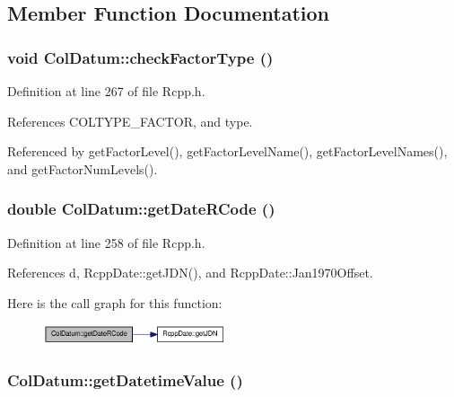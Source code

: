 \subsection{Member Function Documentation}
\hypertarget{classColDatum_a9d151a64fb91608752346a9a16551410}{
\subsubsection[{checkFactorType}]{\setlength{\rightskip}{0pt plus 5cm}void ColDatum::checkFactorType ()}}
\label{classColDatum_a9d151a64fb91608752346a9a16551410}


Definition at line 267 of file Rcpp.h.

References COLTYPE\_\-FACTOR, and type.

Referenced by getFactorLevel(), getFactorLevelName(), getFactorLevelNames(), and getFactorNumLevels().\hypertarget{classColDatum_a87c424137afc43068bf1aba75035851d}{
\subsubsection[{getDateRCode}]{\setlength{\rightskip}{0pt plus 5cm}double ColDatum::getDateRCode ()}}
\label{classColDatum_a87c424137afc43068bf1aba75035851d}


Definition at line 258 of file Rcpp.h.

References d, RcppDate::getJDN(), and RcppDate::Jan1970Offset.

Here is the call graph for this function:\nopagebreak
\begin{figure}[H]
\begin{center}
\leavevmode
\includegraphics[width=153pt]{classColDatum_a87c424137afc43068bf1aba75035851d_cgraph}
\end{center}
\end{figure}
\hypertarget{classColDatum_a408e78096b13b5047ae25e99e945ebf6}{
\subsubsection[{getDatetimeValue}]{ ColDatum::getDatetimeValue ()}}
\label{classColDatum_a408e78096b13b5047ae25e99e945ebf6}


